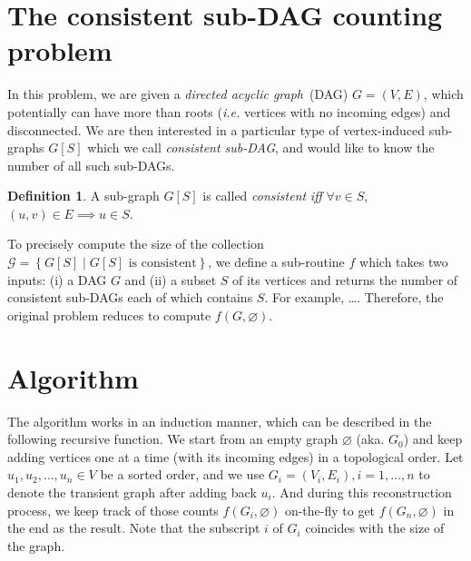 \documentclass[11pt]{article}
\theoremstyle{definition}
\newtheorem{definition}{Definition}[section]
\newcommand{\subg}[2]{\ensuremath{{#1}[#2]}}
\begin{document}
\section{The consistent sub-DAG counting problem}
    In this problem, we are given a \emph{directed acyclic graph}~(DAG)
    $G=(V,E)$, which potentially can have more than roots (\textit{i.e.}
    vertices with no incoming edges) and disconnected. We are then interested in
    a particular type of vertex-induced sub-graphs $\subg{G}{S}$ which we call
    \emph{consistent sub-DAG}, and would like to know the number of all such
    sub-DAGs.  \begin{definition} A sub-graph $\subg{G}{S}$ is called
        \emph{consistent} \textit{iff} $\forall v \in S$, $(u, v) \in E \implies
        u \in S$.  \end{definition} To precisely compute the size of the
    collection $\mathcal{G} = \left\{\subg{G}{S} \mid \subg{G}{S} \mbox{ is
            consistent}\right\}$, we define a sub-routine $f$ which takes two
    inputs: (i) a DAG $G$ and (ii) a subset $S$ of its vertices and returns the
    number of consistent sub-DAGs each of which contains $S$. For example,
    \dots. Therefore, the original problem reduces to compute $f(G,
    \varnothing)$.

\section{Algorithm}
    The algorithm works in an induction manner, which can be described in the
    following recursive function. We start from an empty graph $\varnothing$
    (aka.  $G_0$) and keep adding vertices one at a time (with its incoming
    edges) in a topological order. Let $u_1, u_2, \ldots, u_n \in V$ be a sorted
    order, and we use $G_i = (V_i, E_i), i = 1, \ldots, n$ to denote the
    transient graph after adding back $u_i$. And during this reconstruction
    process, we keep track of those counts $f(G_i, \varnothing)$ on-the-fly to
    get $f(G_n, \varnothing)$ in the end as the result. Note that the subscript
    $i$ of $G_i$ coincides with the size of the graph.
\end{document}

